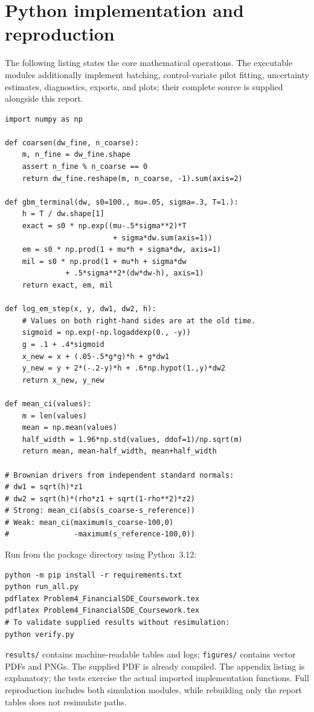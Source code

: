 \documentclass[11pt,a4paper]{article}
\begin{document}
\section{Python implementation and reproduction}
The following listing states the core mathematical operations. The executable
modules additionally implement batching, control-variate pilot fitting, uncertainty estimates, diagnostics, exports, and plots; their complete source is supplied alongside this report.
\begin{lstlisting}[caption={Core SDE updates and coupled error statistics.}]
import numpy as np

def coarsen(dw_fine, n_coarse):
    m, n_fine = dw_fine.shape
    assert n_fine % n_coarse == 0
    return dw_fine.reshape(m, n_coarse, -1).sum(axis=2)

def gbm_terminal(dw, s0=100., mu=.05, sigma=.3, T=1.):
    h = T / dw.shape[1]
    exact = s0 * np.exp((mu-.5*sigma**2)*T
                         + sigma*dw.sum(axis=1))
    em = s0 * np.prod(1 + mu*h + sigma*dw, axis=1)
    mil = s0 * np.prod(1 + mu*h + sigma*dw
              + .5*sigma**2*(dw*dw-h), axis=1)
    return exact, em, mil

def log_em_step(x, y, dw1, dw2, h):
    # Values on both right-hand sides are at the old time.
    sigmoid = np.exp(-np.logaddexp(0., -y))
    g = .1 + .4*sigmoid
    x_new = x + (.05-.5*g*g)*h + g*dw1
    y_new = y + 2*(-.2-y)*h + .6*np.hypot(1.,y)*dw2
    return x_new, y_new

def mean_ci(values):
    m = len(values)
    mean = np.mean(values)
    half_width = 1.96*np.std(values, ddof=1)/np.sqrt(m)
    return mean, mean-half_width, mean+half_width

# Brownian drivers from independent standard normals:
# dw1 = sqrt(h)*z1
# dw2 = sqrt(h)*(rho*z1 + sqrt(1-rho**2)*z2)
# Strong: mean_ci(abs(s_coarse-s_reference))
# Weak: mean_ci(maximum(s_coarse-100,0)
#               -maximum(s_reference-100,0))
\end{lstlisting}
\noindent Run from the package directory using Python~3.12:
\begin{lstlisting}[numbers=none]
python -m pip install -r requirements.txt
python run_all.py
pdflatex Problem4_FinancialSDE_Coursework.tex
pdflatex Problem4_FinancialSDE_Coursework.tex
# To validate supplied results without resimulation:
python verify.py
\end{lstlisting}
\noindent\small \texttt{results/} contains machine-readable tables and logs;
\texttt{figures/} contains vector PDFs and PNGs. The supplied PDF is already compiled. The appendix listing is explanatory; the tests exercise the actual imported implementation functions. Full reproduction includes both simulation modules, while rebuilding only the report tables does not resimulate paths.
\end{document}
